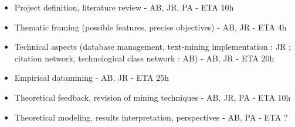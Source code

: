 \begin{itemize}
\item Project definition, literature review - AB, JR, PA - ETA 10h
\item Thematic framing (possible features, precise objectives) - AB, JR - ETA 4h
\item Technical aspects (database management, text-mining implementation : JR ; citation network, technological class network : AB) - AB, JR - ETA 20h
\item Empirical datamining - AB, JR - ETA 25h
\item Theoretical feedback, revision of mining techniques - AB, JR, PA - ETA 10h
\item Theoretical modeling, results interpretation, perspectives - AB, PA - ETA ?
\end{itemize}





















